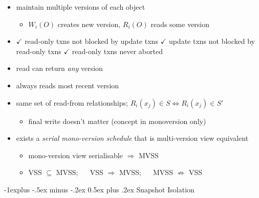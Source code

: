\documentclass[10pt, landscape]{article}
\makeatletter
\renewcommand{\subsection}{\@startsection{subsection}{2}{0mm}%
  {-1explus -.5ex minus -.2ex}%
  {0.5ex plus .2ex}%
{\normalfont\normalsize\bfseries}}
\makeatother
\begin{document}
\begin{multicols*}{4}
  \begin{itemize}
    \item maintain multiple versions of each object
      \begin{itemize}
        \item  $W_i(O)$ creates new version, $R_i(O)$ reads some version
      \end{itemize}
    \item $\checkmark$ read-only txns not blocked by update txns $\checkmark$ update txns not blocked by read-only txns $\checkmark$ read-only txns never aborted
    \item {} read can return \textit{any} version
    \item {} always reads most recent version
    \item {} same set of read-from relationships; $R_i(x_j) \in S \iff R_i(x_j) \in S'$
      \begin{itemize}
        \item final write doesn't matter (concept in monoversion only)
      \end{itemize}
    \item {} exists a \textit{serial mono-version schedule} that is multi-version view equivalent
      \begin{itemize}
        \item mono-version view serialisable $\Rightarrow$ MVSS
        \item VSS $\subseteq$ MVSS; $\quad$ VSS $\Rightarrow$ MVSS; $\quad$ MVSS $\not\Rightarrow$ VSS    
      \end{itemize}
  \end{itemize}

  \subsection{Snapshot Isolation}


\end{multicols*}
\end{document}
